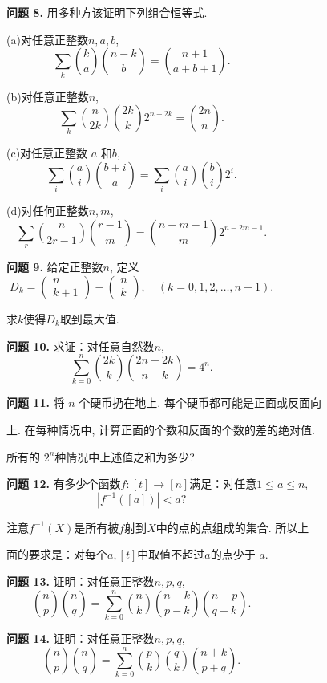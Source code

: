 \documentclass{article}
\begin{document}
\textbf{问题 8.} 用多种方该证明下列组合恒等式. 

\quad(a)对任意正整数$n,a,b$,
$$\sum_k\binom{k}{a}\binom{n-k}{b}=\binom{n+1}{a+b+1}.\hspace{5cm}$$

\quad(b)对任意正整数$n$,
$$\sum_{k}\binom{n}{2k}\binom{2k}{k}2^{n-2k}=\binom{2n}{n}.\hspace{5cm}$$

\quad(c)对任意正整数 $a$ 和$b$,
$$\sum_i\binom{a}{i}\binom{b+i}{a}=\sum_i\binom{a}{i}\binom{b}{i}2^i.\hspace{5cm}$$

\quad(d)对任何正整数$n,m,$
$$\sum_{r}\binom{n}{2r-1}\binom{r-1}{m}=\binom{n-m-1}{m}2^{n-2m-1}.\hspace{5cm}$$

\textbf{问题 9.} 给定正整数$n$, 定义
$$D_k=\begin{pmatrix}n\\k+1\end{pmatrix}-\begin{pmatrix}n\\k\end{pmatrix},\quad(k=0,1,2,\ldots,n-1).\hspace{5cm}$$

求$k$使得$D_k$取到最大值.

\textbf{问题 10.} 求证：对任意自然数$n$,
$$\sum_{k=0}^{n}\binom{2k}{k}\binom{2n-2k}{n-k}=4^{n}.\hspace{5cm}$$

\textbf{问题 11.} 将 $n$ 个硬币扔在地上. 每个硬币都可能是正面或反面向

上. 在每种情况中, 计算正面的个数和反面的个数的差的绝对值.  

所有的 $2^n$种情况中上述值之和为多少?

\textbf{问题 12.} 有多少个函数$f:[t]\to[n]$满足：对任意$1\leq a\leq n$,
$$|f^{-1}([a])|<a?\hspace{5cm}$$

注意$f^{-1}(X)$是所有被$f$射到$X$中的点的点组成的集合. 所以上

面的要求是：对每个$a,[t]$中取值不超过$a$的点少于 $a$.

\textbf{问题 13.} 证明：对任意正整数$n,p,q$,
$$\binom{n}{p}\binom{n}{q}=\sum_{k=0}^{n}\binom{n}{k}\binom{n-k}{p-k}\binom{n-p}{q-k}.\hspace{5cm}$$

\textbf{问题 14.} 证明：对任意正整数$n,p,q$,
\[\binom{n}{p}\binom{n}{q}=\sum_{k=0}^{n}\binom{p}{k}\binom{q}{k}\binom{n+k}{p+q}.\hspace{5cm}\]
\end{document}
